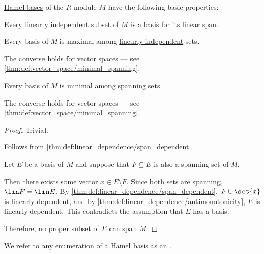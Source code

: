 \begin{proposition}\label{thm:def:hamel_basis}
  \hyperref[def:hamel_basis]{Hamel bases} of the \( R \)-module \( M \) have the following basic properties:
  \begin{thmenum}
     Every \hyperref[def:linear_dependence]{linearly independent} subset of \( M \) is a basis for its \hyperref[def:semimodule/subobject]{linear span}.

     Every basis of \( M \) is maximal among \hyperref[thm:def:linear_dependence]{linearly independent} sets.

    The converse holds for vector spaces --- see \cref{thm:def:vector_space/minimal_spanning}.

     Every basis of \( M \) is minimal among \hyperref[def:linear_span]{spanning sets}.

    The converse holds for vector spaces --- see \cref{thm:def:vector_space/minimal_spanning}.
  \end{thmenum}
\end{proposition}
\begin{proof}
   Trivial.

   Follows from \cref{thm:def:linear_dependence/span_dependent}.

   Let \( E \) be a basis of \( M \) and suppose that \( F \subsetneq E \) is also a spanning set of \( M \).

  Then there exists some vector \( x \in E \setminus F \). Since both sets are spanning, \( \lin F = \lin E \). By \cref{thm:def:linear_dependence/span_dependent}, \( F \cup \set{ x } \) is linearly dependent, and by \cref{thm:def:linear_dependence/antimonotonicity}, \( E \) is linearly dependent. This contradicts the assumption that \( E \) has a basis.

  Therefore, no proper subset of \( E \) can span \( M \).
\end{proof}

\begin{definition}\label{def:ordered_hamel_basis}
  We refer to any \hyperref[def:set_enumeration]{enumeration} of a \hyperref[def:hamel_basis]{Hamel basis} as an .
\end{definition}

